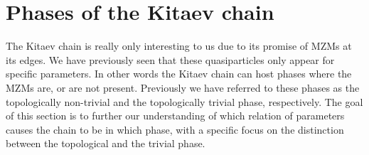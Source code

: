 \section{Phases of the Kitaev chain} \label{sec:Phases_Kitaev_chain}
The Kitaev chain is really only interesting to us due to its promise of MZMs at its edges. We have previously seen that these quasiparticles only appear for specific parameters. In other words the Kitaev chain can host phases where the MZMs are, or are not present. Previously we have referred to these phases as the topologically non-trivial and the topologically trivial phase, respectively. The goal of this section is to further our understanding of which relation of parameters causes the chain to be in which phase, with a specific focus on the distinction between the topological and the trivial phase. 

